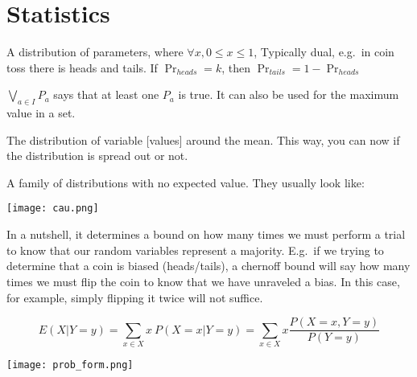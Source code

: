 \section{Statistics}

\begin{definition}\label{bernoulli}
    A distribution of parameters, where $\forall x, 0 \leq x \leq 1$,
    Typically dual, e.g.\ in coin toss there is heads and tails.
    If $\Pr_{heads} = k$, then $\Pr_{tails} = 1 - \Pr_{heads}$
\end{definition}

\begin{definition}[Bigvee]
    $\bigvee\limits_{a \in I} P_{a}$ says that at least one $P_{a}$ is true.
    It can also be used for the maximum value in a set.
\end{definition}

\begin{definition}
    The distribution of variable $[$values$]$ around the mean. 
    This way, you can now if the distribution is spread out or not.

\end{definition}

\begin{definition} 
    A family of distributions with no expected value.
    They usually look like:

    \texttt{[image: cau.png]}

\end{definition}

\begin{definition}\label{chernoff}
    In a nutshell, it determines a bound on how many times we must perform
    a trial to know that our random variables represent a majority.
    E.g.\ if we trying to determine that a coin is biased (heads/tails),
    a chernoff bound will say how many times we must flip the coin to know
    that we have unraveled a bias. In this case, for example, simply flipping it
    twice will not suffice.
\end{definition}

\begin{definition}
    $$
        E(X | Y=y) = \sum\limits_{x \in X} x \
        P(X=x | Y=y) = \sum_{x \in X} x 
        \frac{P(X=x,Y=y)}{P(Y = y)}
    $$
\end{definition}

\begin{definition}
    \texttt{[image: prob\_form.png]}
\end{definition}

